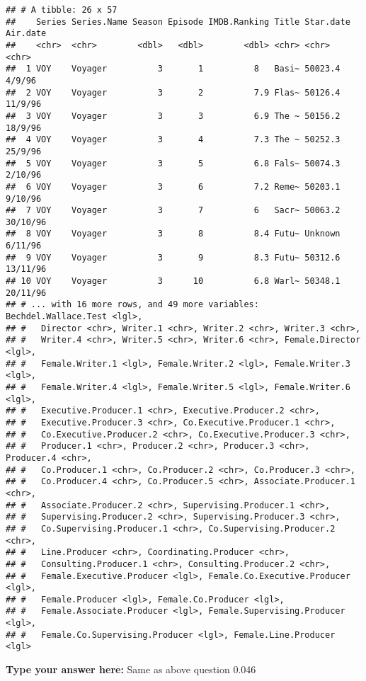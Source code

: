 \documentclass[
]{article}
\begin{document}
\begin{verbatim}
## # A tibble: 26 x 57
##    Series Series.Name Season Episode IMDB.Ranking Title Star.date Air.date
##    <chr>  <chr>        <dbl>   <dbl>        <dbl> <chr> <chr>     <chr>   
##  1 VOY    Voyager          3       1          8   Basi~ 50023.4   4/9/96  
##  2 VOY    Voyager          3       2          7.9 Flas~ 50126.4   11/9/96 
##  3 VOY    Voyager          3       3          6.9 The ~ 50156.2   18/9/96 
##  4 VOY    Voyager          3       4          7.3 The ~ 50252.3   25/9/96 
##  5 VOY    Voyager          3       5          6.8 Fals~ 50074.3   2/10/96 
##  6 VOY    Voyager          3       6          7.2 Reme~ 50203.1   9/10/96 
##  7 VOY    Voyager          3       7          6   Sacr~ 50063.2   30/10/96
##  8 VOY    Voyager          3       8          8.4 Futu~ Unknown   6/11/96 
##  9 VOY    Voyager          3       9          8.3 Futu~ 50312.6   13/11/96
## 10 VOY    Voyager          3      10          6.8 Warl~ 50348.1   20/11/96
## # ... with 16 more rows, and 49 more variables: Bechdel.Wallace.Test <lgl>,
## #   Director <chr>, Writer.1 <chr>, Writer.2 <chr>, Writer.3 <chr>,
## #   Writer.4 <chr>, Writer.5 <chr>, Writer.6 <chr>, Female.Director <lgl>,
## #   Female.Writer.1 <lgl>, Female.Writer.2 <lgl>, Female.Writer.3 <lgl>,
## #   Female.Writer.4 <lgl>, Female.Writer.5 <lgl>, Female.Writer.6 <lgl>,
## #   Executive.Producer.1 <chr>, Executive.Producer.2 <chr>,
## #   Executive.Producer.3 <chr>, Co.Executive.Producer.1 <chr>,
## #   Co.Executive.Producer.2 <chr>, Co.Executive.Producer.3 <chr>,
## #   Producer.1 <chr>, Producer.2 <chr>, Producer.3 <chr>, Producer.4 <chr>,
## #   Co.Producer.1 <chr>, Co.Producer.2 <chr>, Co.Producer.3 <chr>,
## #   Co.Producer.4 <chr>, Co.Producer.5 <chr>, Associate.Producer.1 <chr>,
## #   Associate.Producer.2 <chr>, Supervising.Producer.1 <chr>,
## #   Supervising.Producer.2 <chr>, Supervising.Producer.3 <chr>,
## #   Co.Supervising.Producer.1 <chr>, Co.Supervising.Producer.2 <chr>,
## #   Line.Producer <chr>, Coordinating.Producer <chr>,
## #   Consulting.Producer.1 <chr>, Consulting.Producer.2 <chr>,
## #   Female.Executive.Producer <lgl>, Female.Co.Executive.Producer <lgl>,
## #   Female.Producer <lgl>, Female.Co.Producer <lgl>,
## #   Female.Associate.Producer <lgl>, Female.Supervising.Producer <lgl>,
## #   Female.Co.Supervising.Producer <lgl>, Female.Line.Producer <lgl>
\end{verbatim}

\textbf{Type your answer here:} Same as above question 0.046
\end{document}
